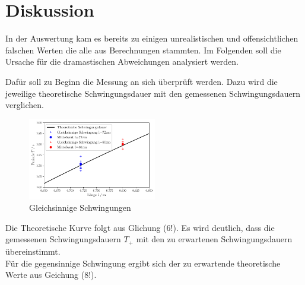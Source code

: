 \section{Diskussion}
\label{sec:Diskussion}

In der Auswertung kam es bereits zu einigen unrealistischen und offensichtlichen
falschen Werten die alle aus Berechnungen stammten.
Im Folgenden soll die Ursache für die dramastischen Abweichungen analysiert werden.


Dafür soll zu Beginn die Messung an sich überprüft werden.
Dazu wird die jeweilige theoretische Schwingungsdauer mit den gemessenen Schwingungsdauern verglichen.
\begin{figure}
    \centering
    \includegraphics[width=0.5\textwidth]{plots/plot1.pdf}
    \caption{Gleichsinnige Schwingungen}
\end{figure}
Die Theoretische Kurve folgt aus Glichung (6!). Es wird deutlich, dass die gemessenen
Schwingungsdauern $T_+$ mit den zu erwartenen Schwingungsdauern übereinstimmt.\\

Für die gegensinnige Schwingung ergibt sich der zu erwartende theoretische Werte aus Geichung (8!).

